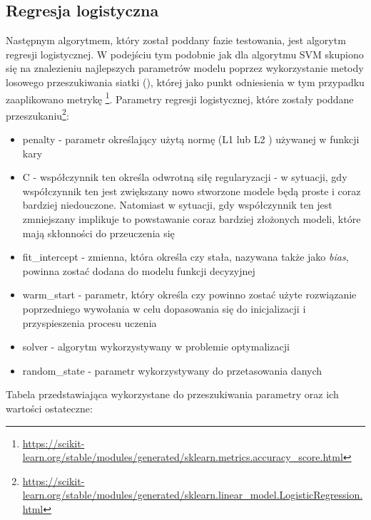        \subsection{Regresja logistyczna}
        \label{tab:params_lr}
        \noindent Następnym algorytmem, który został poddany fazie testowania, jest algorytm regresji logistycznej. W podejściu tym podobnie jak dla algorytmu SVM skupiono się na znalezieniu najlepszych parametrów modelu poprzez wykorzystanie metody losowego przeszukiwania siatki (), której jako punkt odniesienia w tym przypadku zaaplikowano metrykę \footnote{\url{https://scikit-learn.org/stable/modules/generated/sklearn.metrics.accuracy_score.html}}.
        Parametry regresji logistycznej, które zostały poddane przeszukaniu\footnote{\url{https://scikit-learn.org/stable/modules/generated/sklearn.linear_model.LogisticRegression.html}}:
        \begin{itemize}
            \item penalty - parametr określający użytą normę (L1 lub L2 \cite{L1L2}) używanej w funkcji kary
            \item C - współczynnik ten określa odwrotną siłę regularyzacji - w sytuacji, gdy współczynnik ten jest zwiększany nowo stworzone modele będą proste i coraz bardziej niedouczone. Natomiast w sytuacji, gdy współczynnik ten jest zmniejszany implikuje to powstawanie coraz bardziej złożonych modeli, które mają skłonności do przeuczenia się
            \item fit\_intercept - zmienna, która określa czy stała, nazywana także jako \textit{bias}, powinna zostać dodana do modelu funkcji decyzyjnej
            \item warm\_start - parametr, który określa czy powinno zostać użyte rozwiązanie poprzedniego wywołania w celu dopasowania się do inicjalizacji i przyspieszenia procesu uczenia
            \item solver - algorytm wykorzystywany w problemie optymalizacji
            \item random\_state - parametr wykorzystywany do przetasowania danych
        \end{itemize}
        Tabela przedstawiająca wykorzystane do przeszukiwania parametry oraz ich wartości ostateczne:
